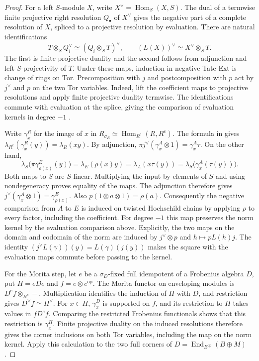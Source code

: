 \documentclass[12pt,a4paper,english,reqno]{amsart}
\numberwithin{equation}{section}
\theoremstyle{plain}
\theoremstyle{definition}
\begin{document}
\begin{proof}
For a left $S$-module $X$, write $X^\vee=\operatorname{Hom}_S(X,S)$.
The dual of a termwise finite projective right resolution
$Q_\bullet$ of $X^\vee$ gives the negative part of a complete
resolution of $X$, spliced to a projective resolution by evaluation.
There are natural identifications
\[
 T\otimes_S Q_i^\vee\simeq(Q_i\otimes_S T)^\vee,\qquad
 (L(X))^\vee\simeq X^\vee\otimes_S T.
\]
The first is finite projective duality and the second follows from
adjunction and left $S$-projectivity of $T$. Under these maps,
induction in negative Tate Ext is change of rings on Tor.
Precomposition with $j$ and postcomposition with $p$ act by
$j^\vee$ and $p$ on the two Tor variables. Indeed, lift the
coefficient maps to projective resolutions and apply finite
projective duality termwise. The identifications commute with
evaluation at the splice, giving the comparison of evaluation
kernels in degree $-1$ \cite[Proposition~2.3]{ISUTateBV}.

Write $\gamma_x^R$ for the image of $x$ in
$R_{\sigma_R}\simeq\operatorname{Hom}_{R^e}(R,R^e)$.
The formula in \cite[Lemma~2.1]{ISUTateBV} gives
$\lambda_{R^e}(\gamma_x^R(y))=\lambda_R(xy)$.
By adjunction,
$\pi j^\vee(\gamma_x^A\otimes1)=\gamma_x^A\tau$.
On the other hand,
\[
 \lambda_S\bigl(\pi\gamma_{\rho(x)}^E(y)\bigr)
 =\lambda_E(\rho(x)y)
 =\lambda_A(x\tau(y))
 =\lambda_S\bigl(\gamma_x^A(\tau(y))\bigr).
\]
Both maps to $S$ are $S$-linear. Multiplying the input by
elements of $S$ and using nondegeneracy proves equality of the maps.
The adjunction therefore gives
$j^\vee(\gamma_x^A\otimes1)=\gamma_{\rho(x)}^E$.
Also $p(1\otimes a\otimes1)=\rho(a)$. Consequently the negative
comparison from $A$ to $E$ is induced on twisted Hochschild
chains by applying $\rho$ to every factor, including the
coefficient. For degree $-1$ this map preserves the norm kernel
by the evaluation comparison above. Explicitly, the two
maps on the domain and codomain of the norm are induced by
$j^\vee\otimes p$ and $h\mapsto pL(h)j$. The identity
$(j^\vee L(\gamma))(y)=L(\gamma)(j(y))$ makes the square with
the evaluation maps commute before passing to the kernel.

For the Morita step, let $e$ be a $\sigma_D$-fixed full idempotent
of a Frobenius algebra $D$, put $H=eDe$ and
$f=e\otimes e^{\mathrm{op}}$. The Morita functor on enveloping
modules is $D^e f\otimes_{H^e}-$. Multiplication identifies the
induction of $H$ with $D$, and restriction gives
$D^\vee f\simeq H^\vee$. For $x\in H$, $\gamma_x^D$ is
supported on $f$, and its restriction to $H$ takes values in
$fD^e f$. Comparing the restricted Frobenius functionals shows
that this restriction is $\gamma_x^H$. Finite projective duality
on the induced resolutions therefore gives the corner inclusions
on both Tor variables, including the map on the norm kernel.
Apply this calculation to the two full corners of
$D=\operatorname{End}_{B^{\mathrm{op}}}(B\oplus M)$.


\end{proof}
\end{document}
